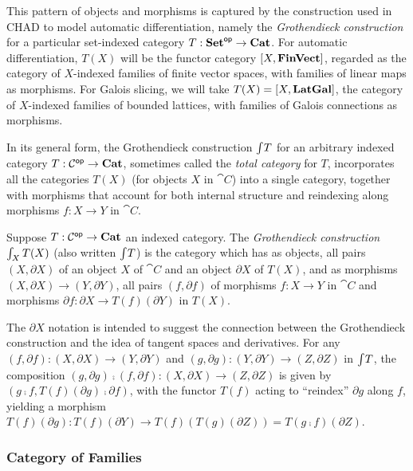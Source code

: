 This pattern of objects and morphisms is captured by the construction used in CHAD to model automatic
differentiation, namely the \emph{Grothendieck construction} for a particular set-indexed category $T:
\mathbf{Set}^{\mathsf{op}} \to \mathbf{Cat}$. For automatic differentiation, $T(X)$ will be the functor category $[X,\mathbf{FinVect}]$,
regarded as the category of $X$-indexed families of finite vector spaces, with families of linear maps as
morphisms. For Galois slicing, we will take $T(X) = [X,\mathbf{LatGal}]$, the category of $X$-indexed families
of bounded lattices, with families of Galois connections as morphisms.

In its general form, the Grothendieck construction $\int_{}T$ for an arbitrary indexed category $T:
\mathcal{C}^{\mathsf{op}} \to \mathbf{Cat}$, sometimes called the \emph{total category} for $T$, incorporates all the categories
$T(X)$ (for objects $X$ in $\cat{C}$) into a single category, together with morphisms that account for both
internal structure and reindexing along morphisms $f: X \to Y$ in $\cat{C}$.

\begin{definition}
\label{def:Grothendieck}
Suppose $T: \mathcal{C}^{\mathsf{op}} \to \mathbf{Cat}$ an indexed category. The \emph{Grothendieck construction}
$\int_{X}T(X)$ (also written $\int_{}T$) is the category which has as objects, all pairs $(X,
\partial X)$ of an object $X$ of $\cat{C}$ and an object $\partial X$ of $T(X)$, and as morphisms $(X,
\partial X) \to (Y, \partial Y)$, all pairs $(f, \partial f)$ of morphisms $f: X \to Y$ in $\cat{C}$ and
morphisms $\partial f: \partial X \to T(f)(\partial Y)$ in $T(X)$.
\end{definition}

\noindent The $\partial X$ notation is intended to suggest the connection between the Grothendieck
construction and the idea of tangent spaces and derivatives. For any $(f, \partial f): (X, \partial X) \to (Y,
\partial Y)$ and $(g, \partial g): (Y, \partial Y) \to (Z, \partial Z)$ in $\int_{}T$, the composition
$(g, \partial g) \comp (f, \partial f): (X, \partial X) \to (Z, \partial Z)$ is given by $(g \comp f,
T(f)(\partial g) \comp \partial f)$, with the functor $T(f)$ acting to ``reindex'' $\partial g$ along $f$,
yielding a morphism $T(f)(\partial g): T(f)(\partial Y) \to T(f)(T(g)(\partial Z)) = T(g \comp f)(\partial
Z)$.


\subsubsection{Category of Families}
\label{sec:Fam}

